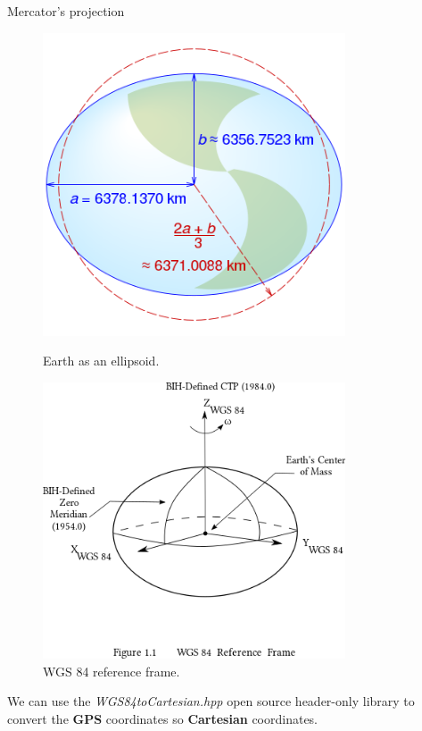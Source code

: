 \documentclass[10pt]{beamer}
\begin{document}
\begin{frame}{Mercator's projection}
  \begin{figure}[H]
    \centering
    \begin{minipage}{0.49\textwidth}
        \centering
        \includegraphics[width=0.8\textwidth]{images/WGS84_mean_Earth_radius.svg.png}
        \caption{Earth as an ellipsoid.}
    \end{minipage}\hfill
    \begin{minipage}{0.49\textwidth}
        \centering
        \includegraphics[width=0.8\textwidth]{images/WGS_84_reference_frame.png}
        \caption{WGS 84 reference frame.}
    \end{minipage}
\end{figure}

We can use the \textit{WGS84toCartesian.hpp}\cite{wgs84_to_cartesian} open source header-only
  library to convert the \textbf{GPS} coordinates so \textbf{Cartesian} coordinates.
\end{frame}
\end{document}
